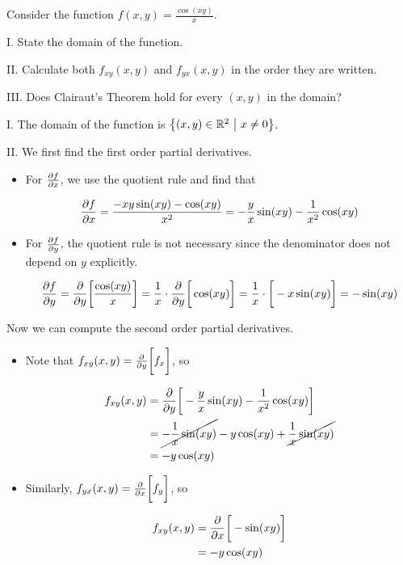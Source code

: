 \documentclass[noauthor,handout]{ximera}
\begin{document}
\begin{problem}
Consider the function $f(x,y) = \frac{\cos(xy)}{x}$.

I. State the domain of the function.

II. Calculate both $f_{xy}(x,y)$ and $f_{yx}(x,y)$ in the order they are written.

III. Does Clairaut's Theorem hold for every $(x,y)$ in the domain?

\begin{freeResponse}
I. The domain of the function is $\left\{(x,y) \in \R^2 ~ \big| ~ x \neq 0\right\}$.

II. We first find the first order partial derivatives.

\begin{itemize}
\item For $\pp[f]{x}$, we use the quotient rule and find that 

\[
\pp[f]{x} = \frac{-xy\sin(xy)-\cos(xy)}{x^2} = -\frac{y}{x}\sin(xy)-\frac{1}{x^2}\cos(xy)
\]

\item For $\pp[f]{y}$, the quotient rule is not necessary since the denominator does not depend on $y$ explicitly. 

\[
\pp[f]{y} = \pp{y} \bigg[\frac{\cos(xy)}{x}\bigg] = \frac{1}{x} \cdot \pp{y} \bigg[\cos(xy)\bigg] = \frac{1}{x} \cdot \bigg[-x\sin(xy)\bigg] = -\sin(xy)
\]
\end{itemize}

Now we can compute the second order partial derivatives.

\begin{itemize}
\item Note that $f_{xy}(x,y) = \pp{y} \bigg[f_x\bigg]$, so

\begin{align*}
f_{xy}(x,y) &= \pp{y} \bigg[  -\frac{y}{x}\sin(xy)-\frac{1}{x^2}\cos(xy)  \bigg] \\
&=  \cancel{-\frac{1}{x}\sin(xy)}-y\cos(xy)+\cancel{\frac{1}{x}\sin(xy)}  \\
&=-y\cos(xy)
\end{align*}

\item Similarly, $f_{yx}(x,y) = \pp{x} \bigg[ f_y\bigg]$, so

\begin{align*}
f_{xy}(x,y) &= \pp{x} \bigg[ -\sin(xy)  \bigg] \\
&=  -y\cos(xy)
\end{align*}
\end{itemize}


\end{freeResponse}
\end{problem}
\end{document}
